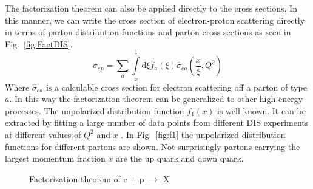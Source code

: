 \documentclass[letterpaper, abstract = on,listof=totoc, bibliography=totoc]{scrreprt}
\begin{document}
The factorization theorem can also be applied directly to the cross sections. In this manner, we can write the cross section of electron-proton scattering directly in terms of parton distribution functions and parton cross sections as seen in Fig.~\ref{fig:FactDIS}.
\begin{equation}
\sigma_{ep} = \sum\limits_a \int\limits_x^1 \text{d}\xi f_a(\xi) \hat{\sigma}_{ea}\left(\frac{x}{\xi},Q^2\right)
\end{equation}
Where $\hat{\sigma}_{ea}$ is a calculable cross section for electron scattering off a parton of type $a$. In this way the factorization theorem can be generalized to other high energy processes.\cite{factorization}
The unpolarized distribution function $f_1(x)$ is well known. It can be extracted by fitting a large number of data points from different DIS experiments at different values of $Q^2$ and $x$ \cite{unpolDisFuncPic}. In Fig.~\ref{fig:f1} the unpolarized distribution functions for different partons are shown. Not surprisingly partons carrying the largest momentum fraction $x$ are the up quark and down quark. 
\begin{figure}[!tbp]
  \centering
  \hfill
  \caption{Factorization theorem of e + p $\rightarrow$ X}
\end{figure}
\end{document}
